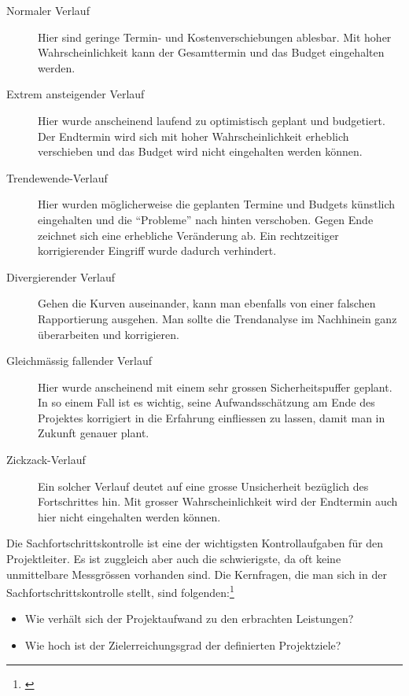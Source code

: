 \begin{description}
    \item [Normaler Verlauf] Hier sind geringe Termin- und Kostenverschiebungen 
    ablesbar. Mit hoher Wahrscheinlichkeit kann der Gesamttermin und das Budget 
    eingehalten werden.

    \item [Extrem ansteigender Verlauf] Hier wurde anscheinend laufend zu optimistisch geplant 
    und budgetiert. Der Endtermin wird sich mit hoher Wahrscheinlichkeit erheblich 
    verschieben und das Budget wird nicht eingehalten werden können.

    \item [Trendewende-Verlauf] Hier wurden möglicherweise die geplanten Termine 
    und Budgets künstlich eingehalten und die ``Probleme'' nach hinten verschoben. 
    Gegen Ende zeichnet sich eine erhebliche Veränderung ab. Ein rechtzeitiger 
    korrigierender Eingriff wurde dadurch verhindert.

    \item [Divergierender Verlauf] Gehen die Kurven auseinander, kann man ebenfalls 
    von einer falschen Rapportierung ausgehen. Man sollte die Trendanalyse im 
    Nachhinein ganz überarbeiten und korrigieren.
    
    \item [Gleichmässig fallender Verlauf] Hier wurde anscheinend mit einem sehr 
    grossen Sicherheitspuffer geplant. In so einem Fall ist es wichtig, seine
    Aufwandsschätzung am Ende des Projektes korrigiert in die Erfahrung einfliessen
    zu lassen, damit man in Zukunft genauer plant.
    
    \item [Zickzack-Verlauf] Ein solcher Verlauf deutet auf eine grosse
    Unsicherheit bezüglich des Fortschrittes hin. Mit grosser Wahrscheinlichkeit
    wird der Endtermin auch hier nicht eingehalten werden können.
\end{description}

Die Sachfortschrittskontrolle ist eine der wichtigsten Kontrollaufgaben für
den Projektleiter. Es ist zuggleich aber auch die schwierigste, da oft keine
unmittelbare Messgrössen vorhanden sind.
Die Kernfragen, die man sich in der Sachfortschrittskontrolle stellt, sind folgenden:\footnote{\citealp*[Vgl.][S. 134]{jenny2009projektmanagement}}

\begin{itemize}
    \item Wie verhält sich der Projektaufwand zu den erbrachten Leistungen?
    \item Wie hoch ist der Zielerreichungsgrad der definierten Projektziele?
\end{itemize}

